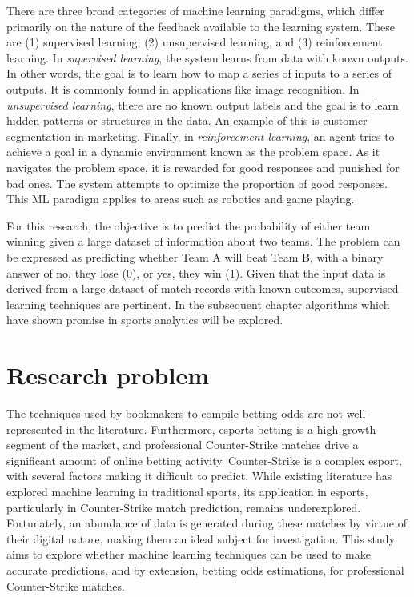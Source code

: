 There are three broad categories of machine learning paradigms, which differ primarily on the nature of the feedback available to the learning system. These are (1) supervised learning, (2) unsupervised learning, and (3) reinforcement learning. In \textit{supervised learning}, the system learns from data with known outputs. In other words, the goal is to learn how to map a series of inputs to a series of outputs. It is commonly found in applications like image recognition. In \textit{unsupervised learning}, there are no known output labels and the goal is to learn hidden patterns or structures in the data. An example of this is customer segmentation in marketing. Finally, in \textit{reinforcement learning}, an agent tries to achieve a goal in a dynamic environment known as the problem space. As it navigates the problem space, it is rewarded for good responses and punished for bad ones. The system attempts to optimize the proportion of good responses. This ML paradigm applies to areas such as robotics and game playing.

For this research, the objective is to predict the probability of either team winning given a large dataset of information about two teams. The problem can be expressed as predicting whether Team A will beat Team B, with a binary answer of no, they lose (0), or yes, they win (1). Given that the input data is derived from a large dataset of match records with known outcomes, supervised learning techniques are pertinent. In the subsequent chapter algorithms which have shown promise in sports analytics will be explored.

\section{Research problem}

The techniques used by bookmakers to compile betting odds are not well-represented in the literature. Furthermore, esports betting is a high-growth segment of the market, and professional Counter-Strike matches drive a significant amount of online betting activity. Counter-Strike is a complex esport, with several factors making it difficult to predict. While existing literature has explored machine learning in traditional sports, its application in esports, particularly in Counter-Strike match prediction, remains underexplored. Fortunately, an abundance of data is generated during these matches by virtue of their digital nature, making them an ideal subject for investigation. This study aims to explore whether machine learning techniques can be used to make accurate predictions, and by extension, betting odds estimations, for professional Counter-Strike matches. 

